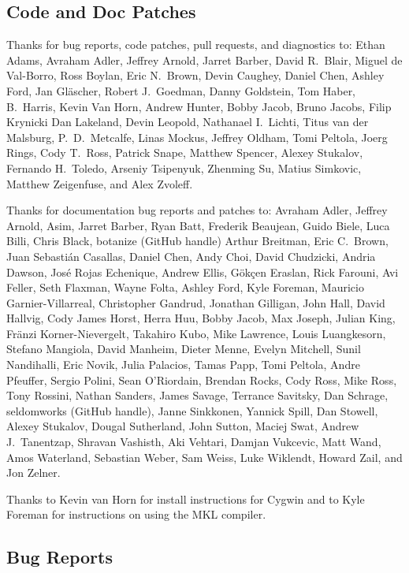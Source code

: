 \subsection*{Code  and Doc Patches}

Thanks for bug reports, code patches, pull requests, and diagnostics
to:
Ethan Adams,
Avraham Adler,
Jeffrey Arnold, 
Jarret Barber, 
David R.~Blair,
Miguel de Val-Borro, 
Ross Boylan, 
Eric N.~Brown, 
Devin Caughey, 
Daniel Chen,
Ashley Ford,
Jan Gl\"ascher,
Robert J.\ Goedman,
Danny Goldstein,
Tom Haber,
B.~Harris,
Kevin Van Horn,
Andrew Hunter,
Bobby Jacob,
Bruno Jacobs,
Filip Krynicki
Dan Lakeland,
Devin Leopold,
Nathanael I.~Lichti,
Titus van der Malsburg,
P.~D.~Metcalfe,
Linas Mockus,
Jeffrey Oldham,
Tomi Peltola,
Joerg Rings,
Cody T.\ Ross,
Patrick Snape,
Matthew Spencer,
Alexey Stukalov,
Fernando H.~Toledo,
Arseniy Tsipenyuk,
Zhenming Su,
Matius Simkovic,
Matthew Zeigenfuse,
and
Alex Zvoleff.

Thanks for documentation bug reports and patches to:
Avraham Adler,
Jeffrey Arnold,
Asim,
Jarret Barber,
Ryan Batt,
Frederik Beaujean,
Guido Biele,
Luca Billi,
Chris Black,
botanize (GitHub handle)
Arthur Breitman,
Eric C.~Brown,
Juan Sebasti\'an Casallas,
Daniel Chen,
Andy Choi, 
David Chudzicki,
Andria Dawson,
Jos\'{e} Rojas Echenique,
Andrew Ellis,
G\"{o}k\c{c}en Eraslan,
Rick Farouni,
Avi Feller,
Seth Flaxman,
Wayne Folta,
Ashley Ford,
Kyle Foreman,
Mauricio Garnier-Villarreal,
Christopher Gandrud,
Jonathan Gilligan,
John Hall,
David Hallvig,
Cody James Horst,
Herra Huu,
Bobby Jacob,
Max Joseph,
Julian King,
Fr\"anzi Korner-Nievergelt,
Takahiro Kubo,
Mike Lawrence,
Louis Luangkesorn,
Stefano Mangiola,
David Manheim,
Dieter Menne,
Evelyn Mitchell,
Sunil Nandihalli,
Eric Novik,
Julia Palacios,
Tamas Papp, 
Tomi Peltola,
Andre Pfeuffer,
Sergio Polini,
Sean O'Riordain,
Brendan Rocks,
Cody Ross,
Mike Ross,
Tony Rossini,
Nathan Sanders,
James Savage,
Terrance Savitsky,
Dan Schrage,
seldomworks (GitHub handle),
Janne Sinkkonen,
Yannick Spill,
Dan Stowell,
Alexey Stukalov,
Dougal Sutherland,
John Sutton,
Maciej Swat,
Andrew J.~Tanentzap,
Shravan Vashisth,
Aki Vehtari,
Damjan Vukcevic,
Matt Wand,
Amos Waterland,
Sebastian Weber,
Sam Weiss,
Luke Wiklendt,
Howard Zail, and
Jon Zelner.

Thanks to Kevin van Horn for install instructions for Cygwin and to
Kyle Foreman for instructions on using the MKL compiler.


\subsection*{Bug Reports}


